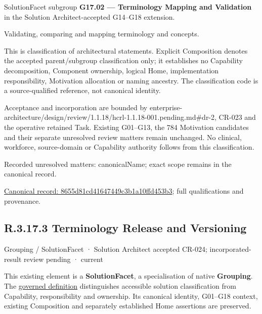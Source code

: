 SolutionFacet subgroup \textbf{G17.02 — Terminology Mapping and Validation} in the Solution Architect-accepted G14–G18 extension.



Validating, comparing and mapping terminology and concepts.



This is classification of architectural statements. Explicit Composition denotes the accepted parent/subgroup classification only; it establishes no Capability decomposition, Component ownership, logical Home, implementation responsibility, Motivation allocation or naming ancestry. The classification code is a source-qualified reference, not canonical identity.



Acceptance and incorporation are bounded by enterprise-architecture/design/review/1.1.18/hcrl-1.1.18-001.pending.md\#dr-2, CR-023 and the operative retained Task. Existing G01–G13, the 784 Motivation candidates and their separate unresolved review matters remain unchanged. No clinical, workforce, source-domain or Capability authority follows from this classification.


{\small Recorded unresolved matters: canonicalName; exact scope remains in the canonical record.}\par
{\footnotesize \href{../../../../../../../continuum/grouping/8655d81cd41647449c3b1a10ffd453b3.md}{Canonical record: 8655d81cd41647449c3b1a10ffd453b3}; full qualifications and provenance.}\par
\subsection*{R.3.17.3 Terminology Release and Versioning}
\label{navigation:R.3.17.3}

\label{element:4e0bcac2a001411c8802b5df30e6bb38}
{\small Grouping / SolutionFacet · Solution Architect accepted CR-024; incorporated-result review pending · current}\par

This existing element is a \textbf{SolutionFacet}, a specialisation of native
\textbf{Grouping}. The \href{\detokenize{../../../../../../../governance/continuum-representation.md#solutionfacet-classification--1119-candidate}}{governed definition}
distinguishes accessible solution classification from Capability, responsibility
and ownership. Its canonical identity, G01–G18 context, existing Composition
and separately established Home assertions are preserved.




